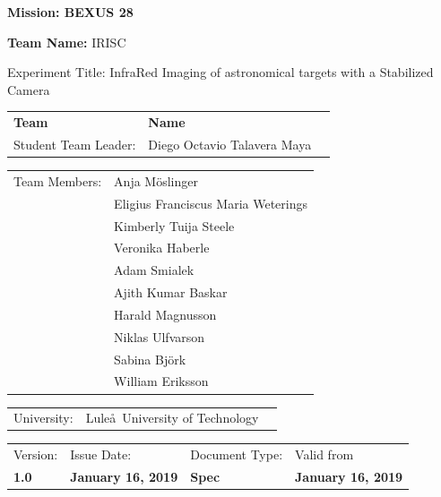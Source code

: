 \documentclass[a4paper,12pt,oneside]{article}
\begin{document}
\begin{flushleft}
\vspace{5pt}

\noindent \textbf{\hspace{-1pt}Mission: BEXUS 28} \\

\vspace{20pt}

{\hspace{-2pt}\noindent \Large{\textbf{Team Name:} } IRISC} \\

\vspace{20pt}

\hspace{-1pt}Experiment Title: InfraRed Imaging of astronomical targets with a Stabilized Camera\\

\vspace{20pt}
\begin{tabular}{p{} p{} p{}}
\textbf{Team} & \textbf{Name}  \\
Student Team Leader: & Diego Octavio Talavera Maya \\
\end{tabular}
\vspace{5pt}
\begin{tabular}{p{} p{}}
	Team Members:  	& Anja M\"oslinger \\
					& Eligius Franciscus Maria Weterings \\
					& Kimberly Tuija Steele \\
					& Veronika Haberle \\
					& Adam Smialek \\
					& Ajith Kumar Baskar \\
					& Harald Magnusson \\
					& Niklas Ulfvarson \\
					& Sabina Bj\"ork \\
					& William Eriksson \\
\end{tabular}

\begin{tabular}{p{} p{} p{}}
University: & Lule\aa \ University of Technology
\end{tabular}

\vspace{0.25cm} 

\begin{tabular}{p{} p{} p{} p{}}
\footnotesize{Version:}     & \footnotesize{Issue Date:} & \footnotesize{Document Type:} & \footnotesize{Valid from} \\
\textbf{1.0}          & \textbf{January 16, 2019}    & \textbf{Spec}   & \textbf{January 16, 2019} \\ 
\end{tabular}


\end{flushleft}
\end{document}
